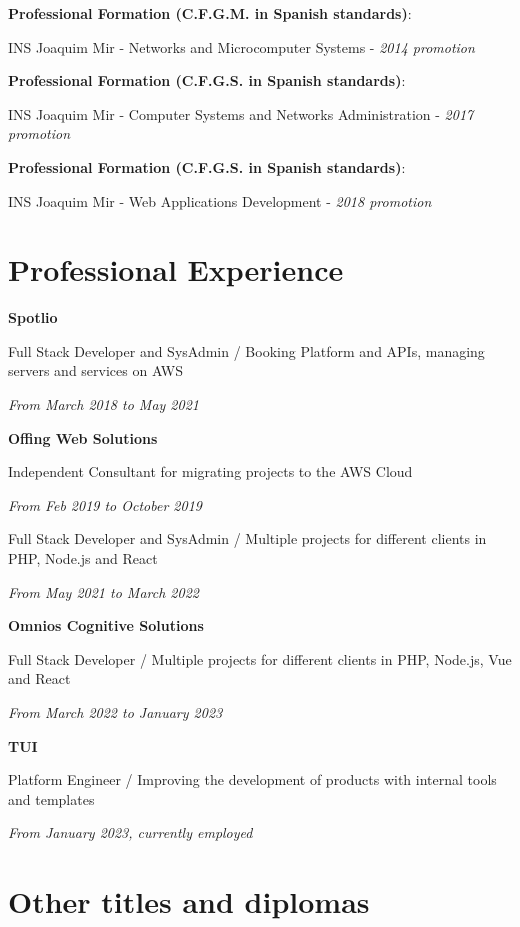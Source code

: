 \documentclass{article}
\newcommand\tab[1][0.5cm]{\hspace*{#1}}
\newcommand{\nl}{\vspace{3mm}}
\begin{document}
{	\textbf{Professional Formation (C.F.G.M. in Spanish standards)}:
	
	\tab INS Joaquim Mir - Networks and Microcomputer Systems - \textit{2014 promotion}
	
	\nl
	\textbf{Professional Formation (C.F.G.S. in Spanish standards)}:
	
	\tab INS Joaquim Mir - Computer Systems and Networks Administration - \textit{2017 promotion}
	
	\nl
	\textbf{Professional Formation (C.F.G.S. in Spanish standards)}:
	
	\tab INS Joaquim Mir - Web Applications Development - \textit{2018 promotion}

	\section*{Professional Experience}

	\nl
	\textbf{Spotlio}
	
	\tab Full Stack Developer and SysAdmin / Booking Platform and APIs, managing servers and services on AWS
	
	\tab \textit{From March 2018 to May 2021}
	
	\nl
	\textbf{Offing Web Solutions}
	
	\tab Independent Consultant for migrating projects to the AWS Cloud
	
	\tab \textit{From Feb 2019 to October 2019}
	
	\tab Full Stack Developer and SysAdmin / Multiple projects for different clients in PHP, Node.js and React
	
	\tab \textit{From May 2021 to March 2022}
	
	\nl
	\textbf{Omnios Cognitive Solutions}
	
	\tab Full Stack Developer / Multiple projects for different clients in PHP, Node.js, Vue and React
	
	\tab \textit{From March 2022 to January 2023}
	
	\nl
	\textbf{TUI}
	
	\tab Platform Engineer / Improving the development of products with internal tools and templates
	
	\tab \textit{From January 2023, currently employed}
	
	\section*{Other titles and diplomas}
	
}
\end{document}
